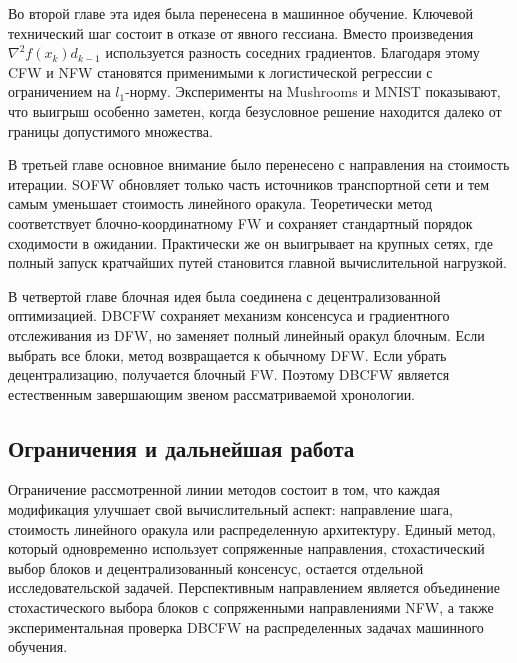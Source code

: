 Во второй главе эта идея была перенесена в машинное обучение.
Ключевой технический шаг состоит в отказе от явного гессиана.
Вместо произведения $\nabla^2 f(x_k)d_{k-1}$ используется разность соседних градиентов.
Благодаря этому CFW и NFW становятся применимыми к логистической регрессии с ограничением
на $l_1$-норму.
Эксперименты на Mushrooms и MNIST показывают, что выигрыш особенно заметен, когда
безусловное решение находится далеко от границы допустимого множества.

В третьей главе основное внимание было перенесено с направления на стоимость итерации.
SOFW обновляет только часть источников транспортной сети и тем самым уменьшает стоимость
линейного оракула.
Теоретически метод соответствует блочно-координатному FW и сохраняет стандартный порядок
сходимости в ожидании.
Практически же он выигрывает на крупных сетях, где полный запуск кратчайших путей становится
главной вычислительной нагрузкой.

В четвертой главе блочная идея была соединена с децентрализованной оптимизацией.
DBCFW сохраняет механизм консенсуса и градиентного отслеживания из DFW, но заменяет полный
линейный оракул блочным.
Если выбрать все блоки, метод возвращается к обычному DFW.
Если убрать децентрализацию, получается блочный FW.
Поэтому DBCFW является естественным завершающим звеном рассматриваемой хронологии.

\subsection{Ограничения и дальнейшая работа}

Ограничение рассмотренной линии методов состоит в том, что каждая модификация улучшает
свой вычислительный аспект: направление шага, стоимость линейного оракула или распределенную
архитектуру.
Единый метод, который одновременно использует сопряженные направления, стохастический выбор
блоков и децентрализованный консенсус, остается отдельной исследовательской задачей.
Перспективным направлением является объединение стохастического выбора блоков с сопряженными
направлениями NFW, а также экспериментальная проверка DBCFW на распределенных задачах
машинного обучения.
